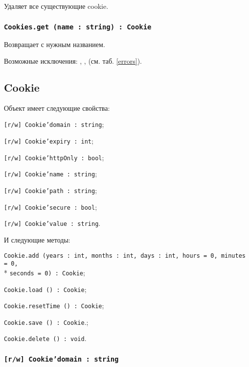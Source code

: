 Удаляет все существующие cookie.

\subsubsection{\texttt{Cookies.get (name : string) : Cookie}}

Возвращает \cookie{} с нужным названием.

Возможные исключения: , ,  (см. таб. \ref{errors}).

\subsection{{\color{orange} Cookie}}

Объект \cookie{} имеет следующие свойства:
\begin{icItems}
	\item \texttt{[r/w] Cookie'domain : string};
	\item \texttt{[r/w] Cookie'expiry : int};
	\item \texttt{[r/w] Cookie'httpOnly : bool};
	\item \texttt{[r/w] Cookie'name : string};
	\item \texttt{[r/w] Cookie'path : string};
	\item \texttt{[r/w] Cookie'secure : bool};
	\item \texttt{[r/w] Cookie'value : string}.
\end{icItems}

И следующие методы:
\begin{icItems}
	\item \texttt{Cookie.add (years : int, months : int, days : int, hours = 0, minutes = 0,}\\* \texttt{seconds = 0) : Cookie};
	\item \texttt{Cookie.load () : Cookie};
	\item \texttt{Cookie.resetTime () : Cookie};
	\item \texttt{Cookie.save () : Cookie}.;
	\item \texttt{Cookie.delete () : void}.
\end{icItems}

\subsubsection{\texttt{[r/w] Cookie'domain : string}}

